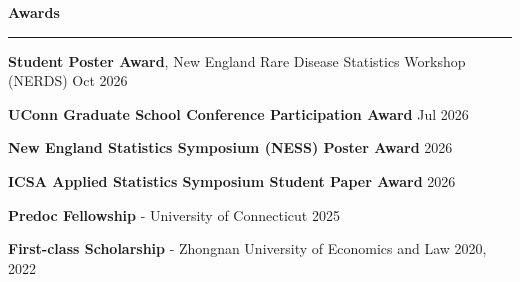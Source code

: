 \documentclass[a4paper,10pt]{article}
\newcommand{\majoritemsep}{\vspace{4pt}}
\newcommand{\resheading}[1]{
  \vspace{4pt}
  \noindent\textbf{\large #1}\par
  \vspace{2pt}
  \hrule
  \vspace{4pt}
}
\newenvironment{reslist}[1][0pt]{%
  \begin{list}{}{%
    \setlength{\leftmargin}{0pt}%
    \setlength{\rightmargin}{0pt}%
    \setlength{\labelwidth}{0pt}%
    \setlength{\labelsep}{0pt}%
    \setlength{\itemindent}{0pt}%
    \setlength{\listparindent}{0pt}%
    \setlength{\itemsep}{#1}%
    \setlength{\topsep}{0pt}%
    \setlength{\parsep}{0pt}%
    \setlength{\partopsep}{0pt}%
  }%
}{\end{list}}
\begin{document}
\resheading{Awards}
\begin{reslist}[2pt]
   \item \textbf{Student Poster Award}, New England Rare Disease Statistics Workshop (NERDS) \hfill Oct 2026
   \item \textbf{UConn Graduate School Conference Participation Award} \hfill Jul 2026
   \item \textbf{New England Statistics Symposium (NESS) Poster Award} \hfill 2026
   \item \textbf{ICSA Applied Statistics Symposium Student Paper Award} \hfill 2026
   \item \textbf{Predoc Fellowship} - University of Connecticut \hfill 2025
   \item \textbf{First-class Scholarship} - Zhongnan University of Economics and Law \hfill 2020, 2022
\end{reslist}
\majoritemsep
\end{document}
